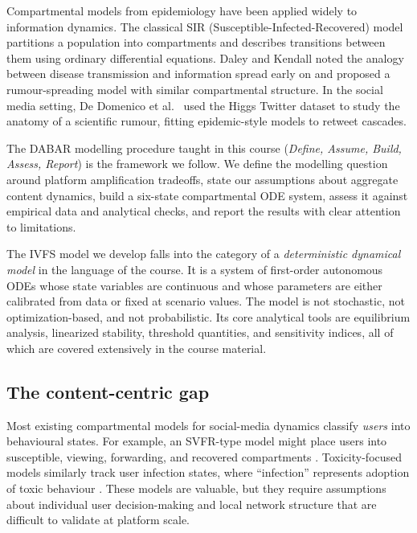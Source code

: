 \documentclass[11pt]{article}
\begin{document}
Compartmental models from epidemiology have been applied widely to information dynamics. The classical SIR (Susceptible-Infected-Recovered) model partitions a population into compartments and describes transitions between them using ordinary differential equations. Daley and Kendall \cite{daleyKendall1964} noted the analogy between disease transmission and information spread early on and proposed a rumour-spreading model with similar compartmental structure. In the social media setting, De Domenico et al.\ \cite{domenico2013} used the Higgs Twitter dataset to study the anatomy of a scientific rumour, fitting epidemic-style models to retweet cascades.

The DABAR modelling procedure taught in this course (\emph{Define, Assume, Build, Assess, Report}) is the framework we follow. We define the modelling question around platform amplification tradeoffs, state our assumptions about aggregate content dynamics, build a six-state compartmental ODE system, assess it against empirical data and analytical checks, and report the results with clear attention to limitations.

The IVFS model we develop falls into the category of a \emph{deterministic dynamical model} in the language of the course. It is a system of first-order autonomous ODEs whose state variables are continuous and whose parameters are either calibrated from data or fixed at scenario values. The model is not stochastic, not optimization-based, and not probabilistic. Its core analytical tools are equilibrium analysis, linearized stability, threshold quantities, and sensitivity indices, all of which are covered extensively in the course material.

\subsection{The content-centric gap}

Most existing compartmental models for social-media dynamics classify \emph{users} into behavioural states. For example, an SVFR-type model might place users into susceptible, viewing, forwarding, and recovered compartments \cite{liShao2024, jing2018}. Toxicity-focused models similarly track user infection states, where ``infection'' represents adoption of toxic behaviour \cite{maleki2022, addai2025}. These models are valuable, but they require assumptions about individual user decision-making and local network structure that are difficult to validate at platform scale.
\end{document}
